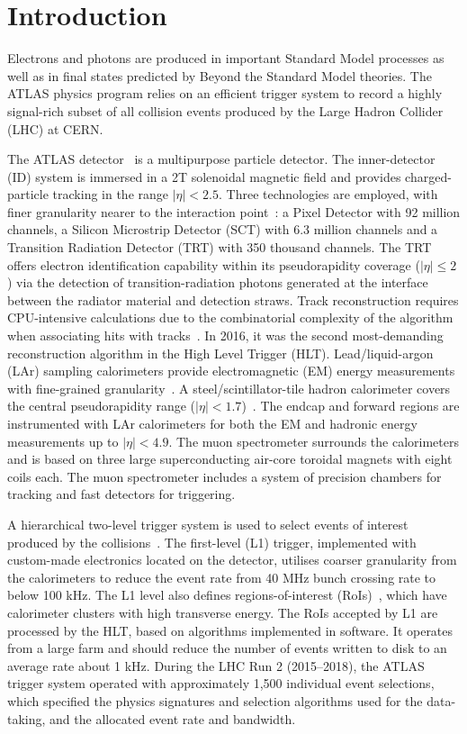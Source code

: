 \section{Introduction}

Electrons and photons are produced in important Standard Model processes as well as in final states predicted by Beyond the Standard Model theories. 
The ATLAS physics program relies on an efficient trigger system to record a highly signal-rich subset of all collision events produced by the Large Hadron Collider (LHC) at CERN.

The ATLAS detector~\cite{PERF-2007-01} is a multipurpose particle detector. 
The inner-detector (ID) system is immersed in a 2T solenoidal magnetic field and provides charged-particle tracking in the range $|\eta|<2.5$.  
Three technologies are employed, with finer granularity nearer to the interaction point~\cite{PERF-2015-08,CERN-LHCC-97-016,Haywood:331064}: a Pixel Detector with 92 million channels, a Silicon Microstrip Detector (SCT) with 6.3 million channels and a Transition Radiation Detector (TRT) with 350 thousand channels. 
The TRT offers electron identification capability within its pseudorapidity coverage ($|\eta|\leq 2$) via the detection of transition-radiation photons generated at the interface between the radiator material and detection straws. 
Track reconstruction requires CPU-intensive calculations due to the combinatorial complexity of the algorithm when associating hits with tracks~\cite{PERF-2015-08}. 
In 2016, it was the second most-demanding reconstruction algorithm in the High Level Trigger (HLT).
Lead/liquid-argon (LAr) sampling calorimeters provide electromagnetic (EM) energy measurements with fine-grained granularity~\cite{LARG-2009-01,larg_tdr}. 
A steel/scintillator-tile hadron calorimeter covers the central pseudorapidity range ($|\eta|< 1.7$)~\cite{TCAL-2017-01,tile_tdr}. 
The endcap and forward regions are instrumented with LAr calorimeters for both the EM and hadronic energy measurements up to $|\eta|< 4.9$. 
The muon spectrometer surrounds the calorimeters and is based on three large superconducting air-core toroidal magnets with eight coils each.  
The muon spectrometer includes a system of precision chambers for tracking and fast detectors for triggering. 

A hierarchical two-level trigger system is used to select events of interest produced by the collisions~\cite{aad2020performance}. 
The first-level (L1) trigger, implemented with custom-made electronics located on the detector, utilises coarser granularity from the calorimeters to reduce the event rate from 40 MHz bunch crossing rate to below 100 kHz. 
The L1 level also defines regions-of-interest (RoIs)~\cite{CERN-LHCC-2017-020}, which have calorimeter clusters with high transverse energy. The RoIs accepted by L1 are processed by the HLT, based on algorithms implemented in software. It operates from a large farm and should reduce the number of events written to disk to an average rate about 1 kHz. During the LHC Run 2 (2015–2018), the ATLAS trigger system operated with approximately 1,500 individual event selections, which specified the physics signatures and selection algorithms used for the data-taking, and the allocated event rate and bandwidth.

